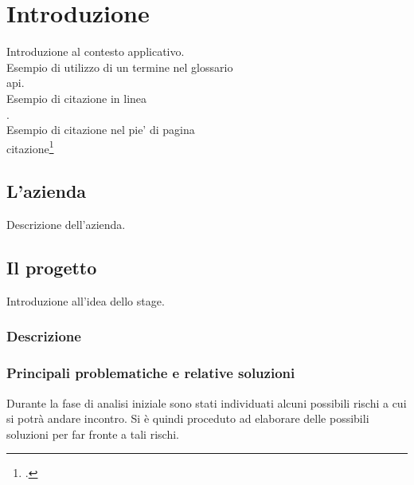 
\chapter{Introduzione}
\label{cap:introduzione}

Introduzione al contesto applicativo.\\

\noindent Esempio di utilizzo di un termine nel glossario \\
\gls{api}. \\

\noindent Esempio di citazione in linea \\
\cite{site:agile-manifesto}. \\

\noindent Esempio di citazione nel pie' di pagina \\
citazione\footcite{womak:lean-thinking} \\

\section{L'azienda}

Descrizione dell'azienda.

\section{Il progetto}

Introduzione all'idea dello stage.

\subsection{Descrizione}

\subsection{Principali problematiche e relative soluzioni}

Durante la fase di analisi iniziale sono stati individuati alcuni possibili rischi a cui si potrà andare incontro.
Si è quindi proceduto ad elaborare delle possibili soluzioni per far fronte a tali rischi.\\


